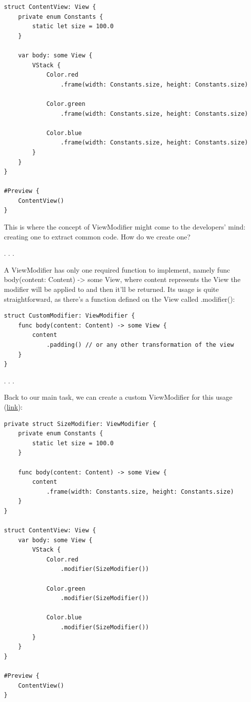 \documentclass{article}
\newcommand{\separator}{\vspace{5mm}\centerline{. . .}\vspace{5mm}}
\begin{document}
\begin{lstlisting}
struct ContentView: View {
    private enum Constants {
        static let size = 100.0
    }

    var body: some View {
        VStack {
            Color.red
                .frame(width: Constants.size, height: Constants.size)

            Color.green
                .frame(width: Constants.size, height: Constants.size)

            Color.blue
                .frame(width: Constants.size, height: Constants.size)
        }
    }
}

#Preview {
    ContentView()
}
\end{lstlisting}

This is where the concept of ViewModifier might come to the developers’ mind: creating one to extract common code. How do we create one?

\separator

\begin{displayquote}
A ViewModifier has only one required function to implement, namely func body(content: Content) -> some View, where content represents the View the modifier will be applied to and then it’ll be returned. Its usage is quite straightforward, as there’s a function defined on the View called .modifier():
\end{displayquote}

\begin{lstlisting}
struct CustomModifier: ViewModifier {
    func body(content: Content) -> some View {
        content
            .padding() // or any other transformation of the view
    }
}
\end{lstlisting}

\separator

Back to our main task, we can create a custom ViewModifier for this usage (\href{https://github.com/stateman92/Medium-ViewModifier/commit/8147cbf88141130ed3aec90a63d47bcbb667dc9c}{link}):

\begin{lstlisting}
private struct SizeModifier: ViewModifier {
    private enum Constants {
        static let size = 100.0
    }

    func body(content: Content) -> some View {
        content
            .frame(width: Constants.size, height: Constants.size)
    }
}

struct ContentView: View {
    var body: some View {
        VStack {
            Color.red
                .modifier(SizeModifier())

            Color.green
                .modifier(SizeModifier())

            Color.blue
                .modifier(SizeModifier())
        }
    }
}

#Preview {
    ContentView()
}
\end{lstlisting}
\end{document}
